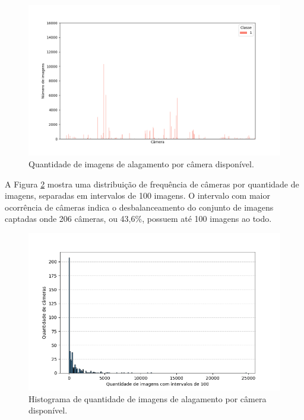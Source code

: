 \begin{figure}[htb]
    \centerline{\includegraphics[width=1\linewidth]{images/metodologia/class_1_count_code.png}}
    \caption{Quantidade de imagens de alagamento por câmera disponível.}
    \label{fig:class1count}
\end{figure}

A Figura \ref{fig:histcodes} mostra uma distribuição de frequência de câmeras por quantidade de imagens, separadas em intervalos de 100 imagens.
O intervalo com maior ocorrência de câmeras indica o desbalanceamento do conjunto de imagens captadas onde 206 câmeras, ou 43,6\%, possuem até 100 imagens ao todo. 

\begin{figure}[htb]
    \centerline{\includegraphics[width=1\linewidth]{images/metodologia/histcodes.png}}
    \caption{Histograma de quantidade de imagens de alagamento por câmera disponível.}
    \label{fig:histcodes}
\end{figure}

